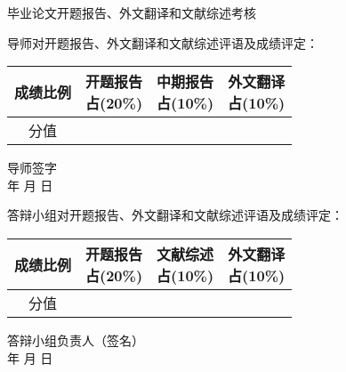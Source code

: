 \thispagestyle{empty}
\begin{center}
\stfangsong\sanhao 毕业论文开题报告、外文翻译和文献综述考核
\end{center}
\songti\sihao 导师对开题报告、外文翻译和文献综述评语及成绩评定：
\vspace{4cm}

{
\hspace{3cm} \songti\xiaosi
\begin{tabular}{|c|c|c|c|}
    \hline
    成绩比例 & \parbox[t]{4em}{开题报告\\[-3.5em]占(20\%)} &
               \parbox[t]{4em}{中期报告\\[-3.5em]占(10\%)} &
               \parbox[t]{4em}{外文翻译\\[-3.5em]占(10\%)} \\

    \hline
    分值   & & &  \\
    \hline
\end{tabular}
}
\begin{flushright}
    导师签字\;\underline{\hspace{4em}}\\
    年 \quad 月 \quad 日
\end{flushright}
\vspace{-1cm}
{\songti\sihao 答辩小组对开题报告、外文翻译和文献综述评语及成绩评定：}
\vspace{4cm}

{
\hspace{3cm} \songti\xiaosi
\begin{tabular}{|c|c|c|c|}
    \hline
    成绩比例 & \parbox[t]{4em}{开题报告\\[-3.5em]占(20\%)} &
               \parbox[t]{4em}{文献综述\\[-3.5em]占(10\%)} &
               \parbox[t]{4em}{外文翻译\\[-3.5em]占(10\%)} \\

    \hline
    分值   & & &  \\
    \hline
\end{tabular}
}
\begin{flushright}
    答辩小组负责人（签名）\;\underline{\hspace{4em}}\\
    年 \quad 月 \quad 日
\end{flushright}

